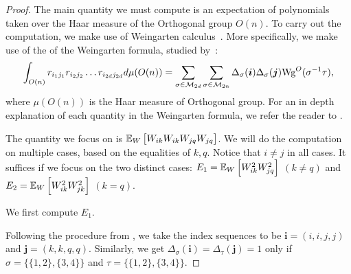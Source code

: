 \begin{proof}
The main quantity we must compute is an expectation of polynomials taken over the Haar measure of the Orthogonal group $O(n)$. To carry out the computation, we make use of Weingarten calculus~\citep{banica2011polynomial, collins2006integration, weingarten1978asymptotic}. More specifically, we make use of the of the Weingarten formula, studied by~\cite{collins2006integration, collins2022weingarten}:
\begin{align}
    \int_{O(n)} r_{i_1 j_1} r_{i_2 j_2} \dots r_{i_{2d} j_{2d}} d\mu(O(n)) = \sum_{\sigma \in \mathcal{M}_{2d}} \sum_{\sigma \in \mathcal{M}_{2n}} \Delta_\sigma(\boldsymbol{i}) \Delta_\sigma(\boldsymbol{j}) \text{Wg}^O(\sigma^{-1}\tau),
\end{align}
where $\mu(O(n))$ is the Haar measure of Orthogonal group. For an in depth explanation of each quantity in the Weingarten formula, we refer the reader to  \citet[Section 5.2]{collins2022weingarten}.

The quantity we focus on is $\mathbb{E}_W \left[W_{ik} W_{ik} W_{jq} W_{jq}\right]$. We will do the computation on multiple cases, based on the equalities of $k, q$. Notice that $i \neq j$ in all cases. It suffices if we focus on the two distinct cases: $E_1 = \mathbb{E}_W \left[W_{ik}^2  W_{jq}^2\right]$ $(k \neq q)$ and $E_2 = \mathbb{E}_W \left[W_{ik}^2  W_{jk}^2\right]$ $(k = q)$.


We first compute $E_1$.

Following the procedure from \citet[Section 5.2]{collins2022weingarten}, we take the index sequences to be $\boldsymbol{i} = (i, i, j, j)$ and $\boldsymbol{j} = (k, k, q, q)$. Similarly, we get $\Delta_\sigma(\boldsymbol{i}) = \Delta_{\tau}(\boldsymbol{j}) = 1$ only if $\sigma = \{ \{1, 2\}, \{3, 4\} \}$ and $\tau = \{ \{1, 2\}, \{3, 4\} \}$. 


\end{proof}
